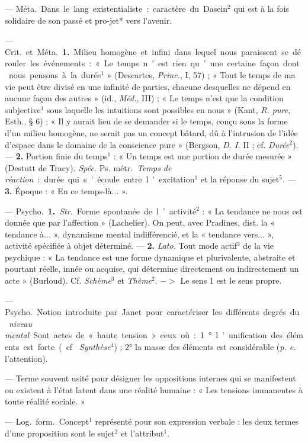 \begin{itemize}[leftmargin=1cm, label=, itemsep=1pt]
 — \si{Méta.} Dans le lang. existentialiste : caractère du
Dasein$^2$ qui est à la fois solidaire de son passé et pro-jet* vers l'avenir.

 — \si{Crit.} et \si{Méta.} {\bf 1.} Milieu homogène et infini dans
lequel nous paraissent se dérouler les événements :
« Le temps n’est rien qu’une certaine façon dont nous pensons à la durée$^1$
» (Descartes, {\it Princ.}, I, 57) ; « Tout le temps de ma vie peut être
divisé en une infinité de parties, chacune desquelles ne dépend en aucune
façon des autres » (id., {\it Méd.}, III) ; « Le temps n’est que la condition
subjective$^1$ sous laquelle les intuitions sont possibles en nous » (Kant,
{\it R. pure}, Esth., § 6) ; « Il y aurait lieu de se demander si le temps,
conçu sous la forme d’un milieu homogène, ne serait pas un concept bâtard, dû
à l’intrusion de l’idée d'espace dans le domaine de la conscience pure
» (Bergson, {\it D. I.} II ; cf. {\it Durée}$^2$). — {\bf 2.} Portion finie
du temps$^1$ : « Un temps est une portion de durée mesurée » (Destutt de
Tracy). {\it Spéc.} \si{Ps. métr.} {\it Temps de réaction} : durée qui
s'écoule entre l'excitation$^1$ et la réponse du sujet$^5$. — {\bf 3.}
Époque : « En ce temps-là... ».

 — \si{Psycho.} {\bf 1.} {\it Str.} Forme spontanée de
l’activité$^2$ : « La tendance ne nous est donnée que par l’affection
» (Lachelier). On peut, avec Pradines, dist. la « tendance à... », dynamisme
mental indifférencié, et la « tendance vers... », activité spécifiée à objet
déterminé. — {\bf 2.} {\it Lato.} Tout mode actif$^3$ de la vie psychique : «
La tendance est une forme dynamique et plurivalente, abstraite et pourtant
réelle, innée ou acquise, qui détermine directement ou indirectement un acte
» (Burloud). Cf. {\it Schème}$^3$ et {\it Thème}$^2$. $->$ Le sens 1 est le sens
propre.

 — \si{Psycho.} Notion introduite par Janet pour
caractériser les différents degrés du {\it niveau mental}. Sont actes de «
haute tension » ceux où : 1° l’unification des éléments est forte (cf. {\it
Synthèse}$^4$) ; 2° la masse des éléments est considérable ({\it p. e.}
l'attention).

 — Terme souvent usité pour désigner les oppositions internes
qui se manifestent ou existent à l’état latent dans une réalité humaine : «
Les tensions immanentes à toute réalité sociale. »

 — \si{Log.} \si{form.} Concept$^1$ représenté pour son expression
verbale : les deux termes d’une proposition sont le sujet$^2$ et
l’attribut$^1$.


\end{itemize}
